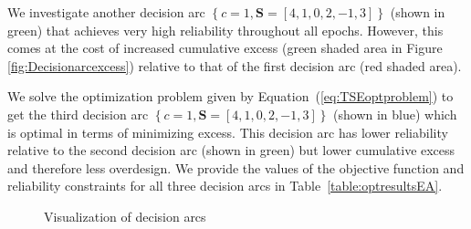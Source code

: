 We investigate another decision arc $\left\{c=1,\mathbf{S}=\left[4,1,0,2,-1,3\right]\right\}$ (shown in green) that achieves very high reliability throughout all epochs. However, this comes at the cost of increased cumulative excess (green shaded area in Figure \ref{fig:Decisionarcexcess}) relative to that of the first decision arc (red shaded area). %

We solve the optimization problem given by Equation~(\ref{eq:TSEoptproblem}) to get the third decision arc $\left\{c=1,\mathbf{S}=\left[4,1,0,2,-1,3\right]\right\}$ (shown in blue) which is optimal in terms of minimizing excess. This decision arc has lower reliability relative to the second decision arc (shown in green) but lower cumulative excess and therefore less overdesign. We provide the values of the objective function and reliability constraints for all three decision arcs in Table~\ref{table:optresultsEA}.

\begin{figure}[h!]
	\centering
	 \hspace{0.1\textwidth}%
	 \hspace{0.1\textwidth}%
	\caption{Visualization of decision arcs}
	\label{fig:epocheraexample}
\end{figure}

\newcommand{\ocwa}{0.75cm} %
\newcommand{\ocwb}{4cm} %
\newcommand{\ocwc}{1.5cm} %
\newcommand{\ocwd}{2cm} %
\newcommand{\ocwe}{3cm} %

